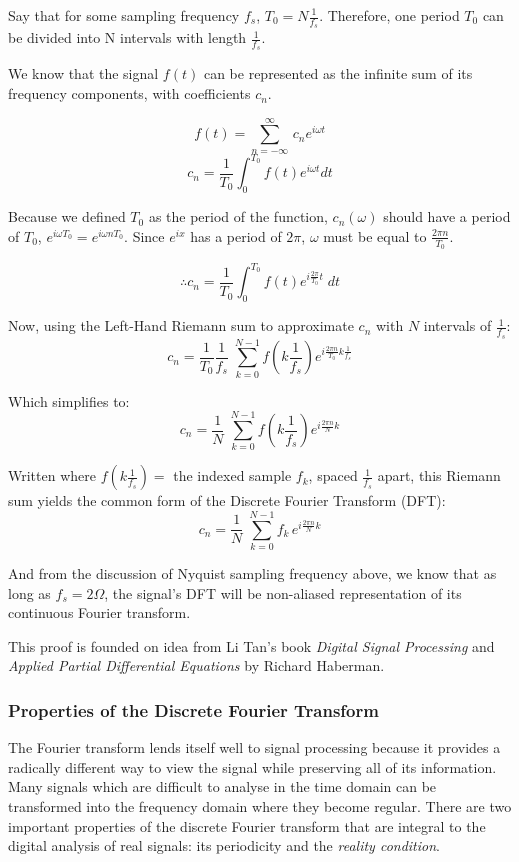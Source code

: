 \documentclass[12pt]{article}
\begin{document}
Say that for some sampling frequency \(f_s\), \(T_0 = N\frac{1}{f_{s}} \).
Therefore, one period \( T_0\) can be divided into N intervals with length \(
\frac{1}{f_{s}}\).

We know that the signal \(f(t)\) can be represented as the infinite sum of its
frequency components, with coefficients \(c_n\).

\[ f(t) = \sum_{n = -\infty}^{\infty} \,c_n e^{i\omega t} \] \[ c_{n} =
\frac{1}{T_0} \int_{0}^{T_0} f(t) e^{i\omega t} dt\]

Because we defined \(T_0\) as the period of the function, \(c_{n}(\omega) \)
should have a period of \( T_0\), \(e^{i\omega T_0} = e^{i\omega nT_0}\). Since
\(e^{i x}\) has a period of \( 2\pi \), \( \omega \) must be equal to
\(\frac{2\pi n}{T_0} \). 

\[ \therefore c_{n} = \frac{1}{T_0} \int_{0}^{T_0} f(t) e^{i \frac{2\pi}{T_0} t
} \; dt\] 

Now, using the Left-Hand Riemann sum to approximate \( c_n\) with \( N\)
intervals of \( \frac{1}{f_s} \): \[ c_{n} = \frac{1}{T_0} \frac{1}{f_s} \;
\sum_{k = 0}^{N-1} f(k \frac{1}{f_s}) e^{i \frac{2\pi n}{T_0} k\frac{1}{f_s}}
\]

Which simplifies to: \[ c_{n} = \frac{1}{N} \; \sum_{k = 0}^{N-1} f(k
\frac{1}{f_s}) e^{i \frac{2\pi n}{N}k} \]

Written where \( f(k \frac{1}{f_s}) =\) the indexed sample \(f_k\), spaced
\(\frac{1}{f_s}\) apart, this Riemann sum yields the common form of the
Discrete Fourier Transform (DFT): \[ c_{n} = \frac{1}{N} \; \sum_{k = 0}^{N-1}
f_k \, e^{i \frac{2\pi n}{N}k} \]

And from the discussion of Nyquist sampling frequency above, we know that as
long as \(f_s = 2\Omega\), the signal's DFT will be non-aliased representation
of its continuous Fourier transform.

This proof is founded on idea from Li Tan's book \emph{Digital Signal
Processing} and \emph{Applied Partial Differential Equations} by Richard
Haberman.

\subsubsection{Properties of the Discrete Fourier Transform}

The Fourier transform lends itself well to signal processing because it
provides a radically different way to view the signal while preserving all of
its information. Many signals which are difficult to analyse in the time domain
can be transformed into the frequency domain where they become regular. There
are two important properties of the discrete Fourier transform that are
integral to the digital analysis of real signals: its periodicity and the
\emph{reality condition}.
\end{document}
